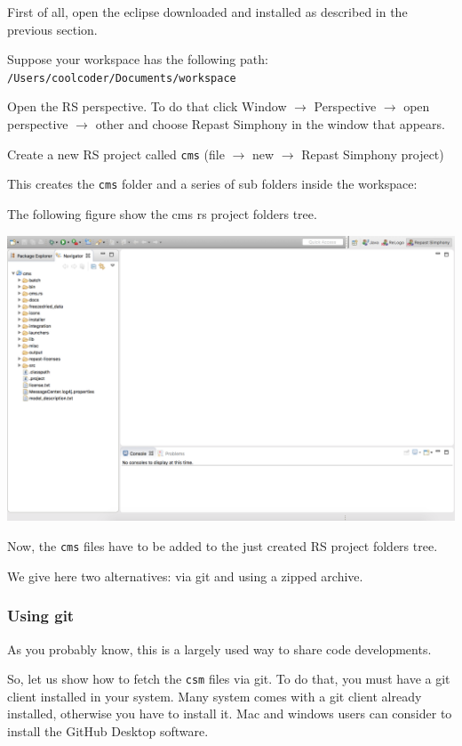 \documentclass{article}
\begin{document}
First of all, open the eclipse downloaded and installed as described in the previous section.

Suppose your workspace has the following path:\\
\verb+/Users/coolcoder/Documents/workspace+

Open the RS perspective. To do that click Window $\rightarrow$ Perspective $\rightarrow$ open perspective $\rightarrow$ other and choose Repast Simphony in the window that appears.

Create a new RS project called \verb+cms+ (file $\rightarrow$ new $\rightarrow$ Repast Simphony project)

This creates the \verb+cms+ folder and a series of sub folders inside the workspace:

The following figure show the cms rs project folders tree.

\vskip2mm
\noindent
\includegraphics[scale=0.35]{fig_cms_rs_navigation}

\vskip2mm
Now, the \verb+cms+ files have to be added to the just created RS project folders tree.

We give here two alternatives: via git and using a zipped archive.

\subsubsection{Using git}

As you probably know, this is a largely used way to share code developments.

So, let us show how to fetch the \verb+csm+ files via git. To do that, you must have a git client installed in your system. Many system comes with a git client already installed, otherwise you have to install it. Mac and windows users can consider to install the GitHub Desktop software.
\end{document}
